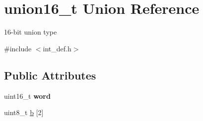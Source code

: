 \hypertarget{unionunion16__t}{\section{union16\+\_\+t Union Reference}
\label{unionunion16__t}
}


16-\/bit union type  




{\ttfamily \#include $<$int\+\_\+def.\+h$>$}

\subsection*{Public Attributes}
\begin{DoxyCompactItemize}
\item 
\hypertarget{unionunion16__t_aa24a6c53d56c137e2c063e9099d8dd72}{uint16\+\_\+t {\bfseries word}}\label{unionunion16__t_aa24a6c53d56c137e2c063e9099d8dd72}

\item 
\hypertarget{unionunion16__t_a8e8aad8f2a4f0d47a986ab1277f2f5bf}{uint8\+\_\+t \hyperlink{unionunion16__t_a8e8aad8f2a4f0d47a986ab1277f2f5bf}{b} \mbox{[}2\mbox{]}}\label{unionunion16__t_a8e8aad8f2a4f0d47a986ab1277f2f5bf}


\end{DoxyCompactItemize}
